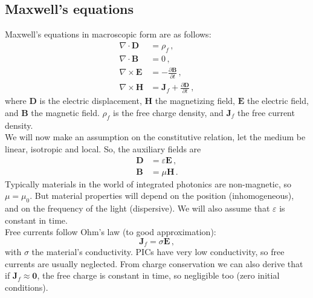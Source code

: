\documentclass[]{article}
\begin{document}
	\subsection{Maxwell's equations}
	Maxwell's equations in macroscopic form are as follows:
	\begin{subequations}
		\begin{align}
			\nabla \cdot \textbf{D} &= \rho_f \, , \\
			\nabla \cdot \textbf{B} &= 0 \, ,\\
			\nabla \times \textbf{E} &= -\frac{\partial \textbf{B}}{\partial t}\, ,\\
			\nabla \times \textbf{H} &= \textbf{J}_f + \frac{\partial \textbf{D}}{\partial t} \, ,
		\end{align}
		\label{Maxwell}
	\end{subequations}
	where $\textbf{D}$ is the electric displacement, $\textbf{H}$ the magnetizing field, $\textbf{E}$ the electric field, and $\textbf{B}$ the magnetic field. $\rho_f$ is the free charge density, and $\textbf{J}_f$ the free current density.\\
	
	We will now make an assumption on the constitutive relation, let the medium be linear, isotropic and local. So, the auxiliary fields are
	\begin{subequations}
		\begin{align}
			\textbf{D} &= \varepsilon \textbf{E}\, ,\\
			\textbf{B} &= \mu \textbf{H} \, .
		\end{align}
	\end{subequations}
	Typically materials in the world of integrated photonics are non-magnetic, so $\mu = \mu_0$. But material properties will depend on the position (inhomogeneous), and on the frequency of the light (dispersive). We will also assume that $\varepsilon$ is constant in time.\\
	
	Free currents follow Ohm's law (to good approximation):
	\begin{equation}
		\textbf{J}_f = \sigma \textbf{E} \, ,
	\end{equation}
	with $\sigma$ the material's conductivity. PICs have very low conductivity, so free currents are usually neglected. From charge conservation we can also derive that if $\textbf{J}_f \approx \textbf{0}$, the free charge is constant in time, so negligible too (zero initial conditions).\\
	
\end{document}
